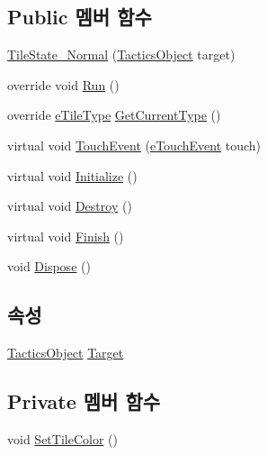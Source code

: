 \subsection*{Public 멤버 함수}
\begin{DoxyCompactItemize}
\item 
\hyperlink{class_tile_1_1_tile_state___normal_ad67f867107e747a20146e137cfb56eaf}{Tile\+State\+\_\+\+Normal} (\hyperlink{class_tactics_object}{Tactics\+Object} target)
\item 
override void \hyperlink{class_tile_1_1_tile_state___normal_acf613382b6ddeff2fcc226d8caeb0b53}{Run} ()
\item 
override \hyperlink{_tile_8cs_a271bc07be325bca511bcb747e0ff2fda}{e\+Tile\+Type} \hyperlink{class_tile_1_1_tile_state___normal_ad649955a61ea5ca2158b3c379ea8c505}{Get\+Current\+Type} ()
\item 
virtual void \hyperlink{class_tile_1_1_tile_state_a3ddb7ad41bed1404287b6847dd4edf05}{Touch\+Event} (\hyperlink{_touch_manager_8cs_ae33e321a424fe84ba8b2fdb81ad40a68}{e\+Touch\+Event} touch)
\item 
virtual void \hyperlink{class_m_c_n_1_1_state_a5be59bc891e64cbbe4322d74a6746908}{Initialize} ()
\item 
virtual void \hyperlink{class_m_c_n_1_1_state_aebf48ef248bbf185d6aae91d9789459e}{Destroy} ()
\item 
virtual void \hyperlink{class_m_c_n_1_1_state_a2492ca731678b8216c02134dddeeb745}{Finish} ()
\item 
void \hyperlink{class_m_c_n_1_1_state_af6df0477e0dead784489688cb2c2093e}{Dispose} ()
\end{DoxyCompactItemize}
\subsection*{속성}
\begin{DoxyCompactItemize}
\item 
\hyperlink{class_tactics_object}{Tactics\+Object} \hyperlink{class_m_c_n_1_1_state_a79a563b32f183c9adc9a96679fc57eb8}{Target}
\end{DoxyCompactItemize}
\subsection*{Private 멤버 함수}
\begin{DoxyCompactItemize}
\item 
void \hyperlink{class_tile_1_1_tile_state___normal_a81d8bc6e280e6143ff42a292e863307e}{Set\+Tile\+Color} ()
\end{DoxyCompactItemize}


